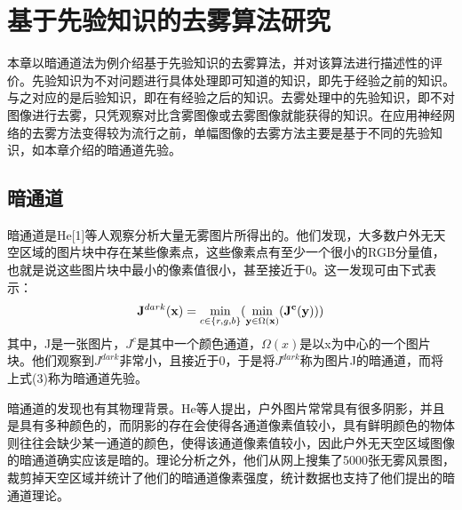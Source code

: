 \documentclass[a4paper, 12pt]{report}
\begin{document}
\chapter{基于先验知识的去雾算法研究\quad}
本章以暗通道法为例介绍基于先验知识的去雾算法，并对该算法进行描述性的评价。先验知识为不对问题进行具体处理即可知道的知识，即先于经验之前的知识。与之对应的是后验知识，即在有经验之后的知识。去雾处理中的先验知识，即不对图像进行去雾，只凭观察对比含雾图像或去雾图像就能获得的知识。在应用神经网络的去雾方法变得较为流行之前，单幅图像的去雾方法主要是基于不同的先验知识，如本章介绍的暗通道先验。
\section{暗通道\quad }
暗通道是He[1]等人观察分析大量无雾图片所得出的。他们发现，大多数户外无天空区域的图片块中存在某些像素点，这些像素点有至少一个很小的RGB分量值，也就是说这些图片块中最小的像素值很小，甚至接近于0。这一发现可由下式表示：
\begin{equation}
{\bf J}^{dark}{\bf (x)} = \min_{c \in \{r, g, b\}}(\min_{{\bf y} \in \Omega({\bf x})}(\bf J^c(y)))
\end{equation}
其中，J是一张图片，$J^c$是其中一个颜色通道，$\Omega(x)$是以x为中心的一个图片块。他们观察到$J^{dark}$非常小，且接近于0，于是将$J^{dark}$称为图片J的暗通道，而将上式(3)称为暗通道先验。

	暗通道的发现也有其物理背景。He等人提出，户外图片常常具有很多阴影，并且是具有多种颜色的，而阴影的存在会使得各通道像素值较小，具有鲜明颜色的物体则往往会缺少某一通道的颜色，使得该通道像素值较小，因此户外无天空区域图像的暗通道确实应该是暗的。理论分析之外，他们从网上搜集了5000张无雾风景图，裁剪掉天空区域并统计了他们的暗通道像素强度，统计数据也支持了他们提出的暗通道理论。
\end{document}
